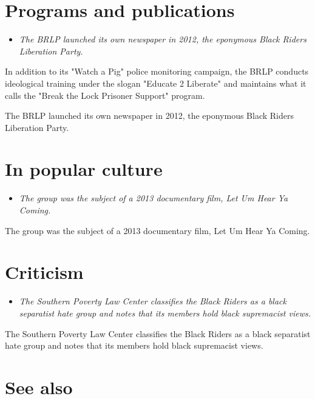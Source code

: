 \section{Programs and publications}\label{programs-and-publications}

\begin{itemize}
\item
  \emph{The BRLP launched its own newspaper in 2012, the eponymous Black
  Riders Liberation Party.}
\end{itemize}

In addition to its "Watch a Pig" police monitoring campaign, the BRLP
conducts ideological training under the slogan "Educate 2 Liberate" and
maintains what it calls the "Break the Lock Prisoner Support" program.

The BRLP launched its own newspaper in 2012, the eponymous Black Riders
Liberation Party.

\section{In popular culture}\label{in-popular-culture}

\begin{itemize}
\item
  \emph{The group was the subject of a 2013 documentary film, Let Um
  Hear Ya Coming.}
\end{itemize}

The group was the subject of a 2013 documentary film, Let Um Hear Ya
Coming.

\section{Criticism}\label{criticism}

\begin{itemize}
\item
  \emph{The Southern Poverty Law Center classifies the Black Riders as a
  black separatist hate group and notes that its members hold black
  supremacist views.}
\end{itemize}

The Southern Poverty Law Center classifies the Black Riders as a black
separatist hate group and notes that its members hold black supremacist
views.

\section{See also}\label{see-also}

